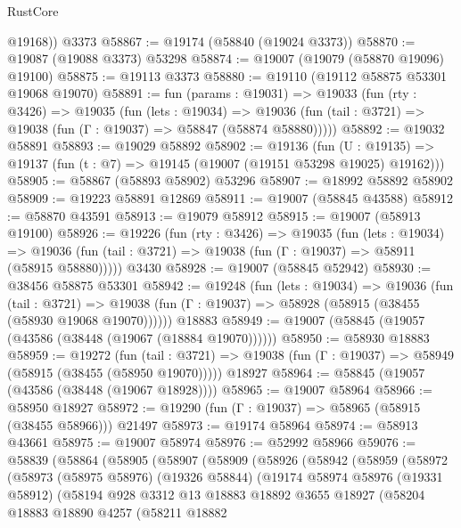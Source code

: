 \begin{lexlean}{RustCore}
\begin{coremodule}
        @19168))
    @3373
@58867 := @19174 (@58840 (@19024 @3373))
@58870 := @19087 (@19088 @3373) @53298
@58874 := @19007 (@19079 (@58870 @19096) @19100)
@58875 := @19113 @3373
@58880 := @19110 (@19112 @58875 @53301 @19068 @19070)
@58891 := fun (params : @19031) =>
  @19033
    (fun (rty : @3426) =>
    @19035
      (fun (lets : @19034) =>
      @19036 (fun (tail : @3721) => @19038 (fun (Γ : @19037) => @58847 (@58874 @58880)))))
@58892 := @19032 @58891
@58893 := @19029 @58892
@58902 := @19136
    (fun (U : @19135) => @19137 (fun (t : @7) => @19145 (@19007 (@19151 @53298 @19025) @19162)))
@58905 := @58867 (@58893 @58902) @53296
@58907 := @18992 @58892 @58902
@58909 := @19223 @58891 @12869
@58911 := @19007 (@58845 @43588)
@58912 := @58870 @43591
@58913 := @19079 @58912
@58915 := @19007 (@58913 @19100)
@58926 := @19226
    (fun (rty : @3426) =>
    @19035
      (fun (lets : @19034) =>
      @19036 (fun (tail : @3721) => @19038 (fun (Γ : @19037) => @58911 (@58915 @58880)))))
    @3430
@58928 := @19007 (@58845 @52942)
@58930 := @38456 @58875 @53301
@58942 := @19248
    (fun (lets : @19034) =>
    @19036
      (fun (tail : @3721) =>
      @19038 (fun (Γ : @19037) => @58928 (@58915 (@38455 (@58930 @19068 @19070))))))
    @18883
@58949 := @19007 (@58845 (@19057 (@43586 (@38448 (@19067 (@18884 @19070))))))
@58950 := @58930 @18883
@58959 := @19272
    (fun (tail : @3721) => @19038 (fun (Γ : @19037) => @58949 (@58915 (@38455 (@58950 @19070)))))
    @18927
@58964 := @58845 (@19057 (@43586 (@38448 (@19067 @18928))))
@58965 := @19007 @58964
@58966 := @58950 @18927
@58972 := @19290 (fun (Γ : @19037) => @58965 (@58915 (@38455 @58966))) @21497
@58973 := @19174 @58964
@58974 := @58913 @43661
@58975 := @19007 @58974
@58976 := @52992 @58966
@59076 := @58839
    (@58864
      (@58905
        (@58907
          (@58909
            (@58926
              (@58942
                (@58959
                  (@58972
                    (@58973
                      (@58975 @58976)
                      (@19326 @58844)
                      (@19174
                        @58974
                        @58976
                        (@19331 @58912)
                        (@58194
                          @928
                          @3312
                          @13
                          @18883
                          @18892
                          @3655
                          @18927
                          (@58204
                            @18883
                            @18890
                            @4257
                            (@58211
                              @18882

\end{coremodule}
\end{lexlean}
